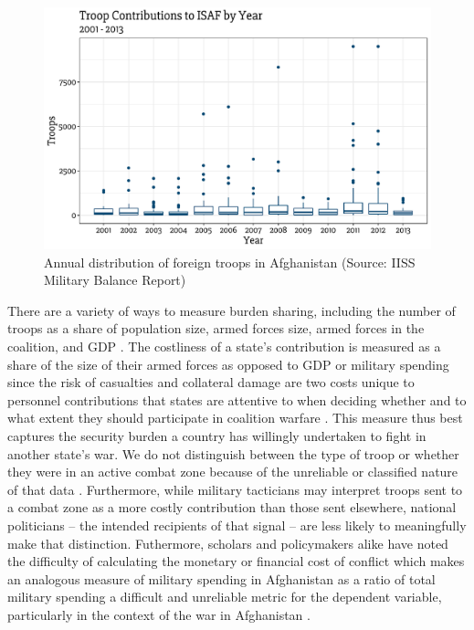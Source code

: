 \documentclass[12pt,letterpaper]{article}
\begin{document}
		\begin{figure}[H]
			\centering
			\includegraphics[width = \textwidth]{figures/troop_year.pdf}
			\caption{Annual distribution of foreign troops in Afghanistan (Source: IISS Military Balance Report)}
			\label{fig:afghan_total}
		\end{figure}
		
		There are a variety of ways to measure burden sharing, including the number of troops as a share of population size, armed forces size, armed forces in the coalition, and GDP \citep[668-669]{hartley_natoburdensharingfuture_1999}. The costliness of a state's contribution is measured as a share of the size of their armed forces as opposed to GDP or military spending since the risk of casualties and collateral damage are two costs unique to personnel contributions that states are attentive to when deciding whether and to what extent they should participate in coalition warfare \citep{ringsmose_natoburdensharingredux_2010, chivvis_topplingqaddafilibya_2014, vonhlatky_cashcombatamerica_2015, haesebrouck_natoburdensharing_2017}. This measure thus best captures the security burden a country has willingly undertaken to fight in another state's war. We do not distinguish between the type of troop or whether they were in an active combat zone because of the unreliable or classified nature of that data \citep[44-45]{bogers_missionafghanistanwho_2013}. Furthermore, while military tacticians may interpret troops sent to a combat zone as a more costly contribution than those sent elsewhere, national politicians -- the intended recipients of that signal -- are less likely to meaningfully make that distinction. Futhermore, scholars and policymakers alike have noted the difficulty of calculating the monetary or financial cost of conflict \citep{stiglitz_estimatingcostswar_2012} which makes an analogous measure of military spending in Afghanistan as a ratio of total military spending a difficult and unreliable metric for the dependent variable, particularly in the context of the war in Afghanistan \citep{bruck_economiccostsgerman_2011}.
\end{document}
